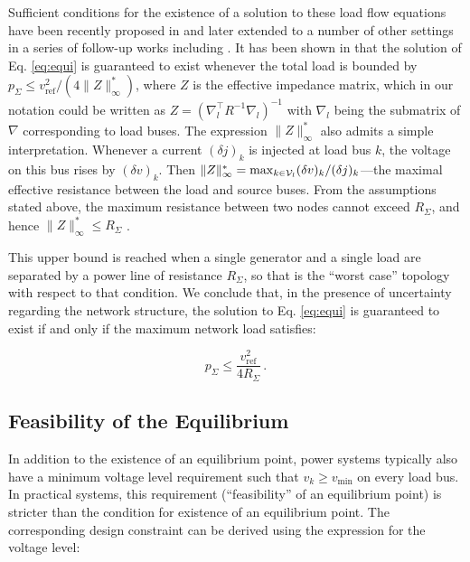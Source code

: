 \documentclass[letterpaper, 10 pt, conference]{ieeeconf}
\begin{document}
Sufficient conditions for the existence of a solution to these load flow equations have been recently proposed in \cite{Bolognani:2015ek} and later extended to a number of other settings in a series of follow-up works including \cite{SimpsonPorco:2015hp,Yu:2015kl,Wang:2016vc}. It has been shown in \cite{Bolognani:2015ek} that the solution of Eq. \eqref{eq:equi} is guaranteed to exist whenever the total load is bounded by  $p_\Sigma \leq v_{\mathrm{ref}}^2/(4 \|Z\|_\infty^*)$, where $Z$ is the effective impedance matrix, which in our notation could be written as $Z = (\nabla_l^\top R^{-1}\nabla_l)^{-1}$ with $\nabla_l$ being the submatrix of $\nabla$ corresponding to load buses. The expression $\|Z\|_\infty^*$ also admits a simple interpretation. Whenever a current $(\delta j)_k$ is injected at load bus $k$, the voltage on this bus rises by $(\delta v)_k$. Then $\|Z\|_\infty^* = \max_{k\in {\cal V}_l} (\delta v)_k/(\delta j)_k$---the maximal effective resistance between the load and source buses. From the assumptions stated above, the maximum resistance between two nodes cannot exceed  $R_\Sigma$, and hence $\|Z\|_\infty^* \leq R_\Sigma$ .

This upper bound is reached when a single generator and a single load are separated by a power line of resistance $R_\Sigma$, so that is the ``worst case'' topology with respect to that condition. We conclude that, in the presence of uncertainty regarding the network structure, the solution to Eq. \eqref{eq:equi} is guaranteed to exist if and only if the maximum network load satisfies:

\begin{equation}\label{eq:exist}
    p_\Sigma \leq \frac{v_{\mathrm{ref}}^2}{4 R_\Sigma}\,.
\end{equation}

\subsection{Feasibility of the Equilibrium}
In addition to the existence of an equilibrium point, power systems typically also have a minimum voltage level requirement such that $v_k \geq v_{\min}$ on every load bus. In practical systems, this requirement (``feasibility'' of an equilibrium point) is stricter than the condition for existence of an equilibrium point. The corresponding design constraint can be derived using the expression for the voltage level:
\end{document}

